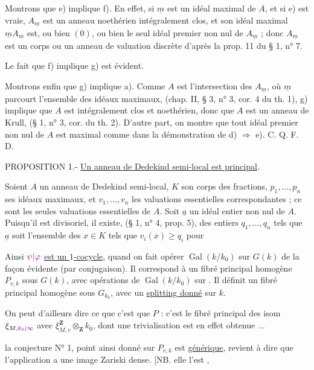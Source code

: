 Montrons que e) implique f). En effet, si $\underline m$ est un idéal maximal de $A$, et si e) est vraie, $A_{\underline m}$ est un anneau noethérien intégralement clos, et son idéal maximal $\underline mA_{\underline m}$ est, ou bien $(0)$, ou bien le seul idéal premier non nul de $A_{\underline m}$ ; donc $A_{\underline m}$ est un corps ou un anneau de valuation discrète d'après la prop. 11 du § 1, n° 7.

Le fait que f) implique g) est évident.

Montrons enfin que g) implique a). Comme $A$ est l'intersection des $A_{\underline m}$, où $\underline m$ parcourt l'ensemble des idéaux maximaux, (chap. II, § 3, n° 3, cor. 4 du th. 1), g) implique que $A$ est intégralement clos et noethérien, donc que $A$ est un anneau de Krull, (§ 1, n° 3, cor. du th. 2). D'autre part, on montre que tout idéal premier non nul de $A$ est maximal comme dans la démonstration de d) $\Longrightarrow$ e). C. Q. F. D.

PROPOSITION 1.- \uline{Un anneau de Dedekind semi-local est principal}.

Soient $A$ un anneau de Dedekind semi-local, $K$ son corps des fractions, $p_1,\ldots,p_n$ ses idéaux maximaux, et $v_1,\ldots,v_n$ les valuations essentielles correspondantes ; ce sont les seules valuations essentielles de $A$. Soit $\underline a$ un idéal entier non nul de $A$. Puisqu'il est divisoriel, il existe, (§ 1, n° 4, prop. 5), des entiers $q_1,\ldots,q_n$ tels que $\underline a$ soit l'ensemble des $x\in K$ tels que $v_i(x)\ge q_i$ pour

Ainsi $\unsure{\psi|\varphi}$ \uline{est un $1$-cocycle}, quand on fait opérer $\operatorname{Gal}(k/k_0)$ sur $G(k)$ de la façon évidente (par conjugaison). Il correspond à un fibré principal homogène $P_{v,k}$ sous $G(k)$, avec opérations de $\operatorname{Gal}(k/k_0)$ sur . Il définit  un fibré principal homogène  sous $G_{k_0}$, avec un \uline{splitting donné} sur $k$.

On peut d'ailleurs dire ce que c'est que $P$ : c'est le fibré principal des isom  $\xi_{M,\unsure{k_0|\infty}}$ avec $\xi_{M,v}^{\mathbf Z}\otimes_{\mathbf Z}k_0$, dont une trivialisation est en effet obtenue $\ldots$

 la conjecture  N° 1,   point ainsi donné sur $P_{v,k}$ est \uline{générique}, revient à dire que l'application
 a une image Zariski dense. [NB. elle l'est ,


